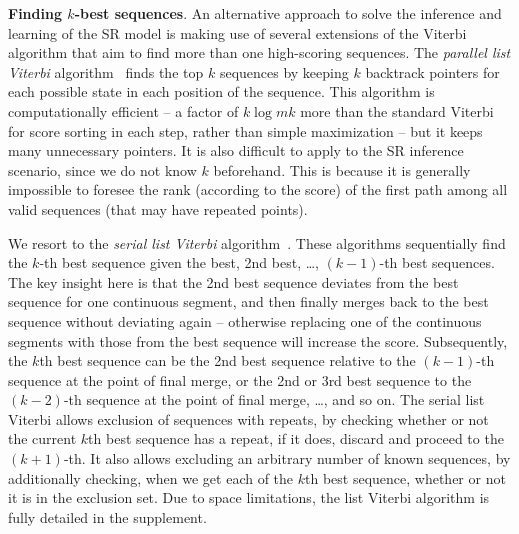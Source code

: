 \textbf{Finding $k$-best sequences}.
An alternative approach to solve the inference and learning of the SR model is making use of 
several extensions of the Viterbi algorithm that aim to find more than one high-scoring sequences.
The \emph{parallel list Viterbi} algorithm~\cite{seshadri1994list} finds the top $k$ sequences
by keeping $k$ backtrack pointers for each possible state in each position of the sequence.
This algorithm is computationally efficient
-- a factor of $k\log mk$ %
more than the standard Viterbi for score sorting in each step, rather than simple maximization
-- but it keeps many unnecessary pointers. It is also difficult to apply to the SR inference scenario,
since we do not know $k$ beforehand. This is because it is generally impossible to foresee
the rank (according to the score) of the first path among all valid sequences (that may have repeated points).

We resort to the \emph{serial list Viterbi} algorithm~\cite{seshadri1994list,nilsson2001sequentially}.
These algorithms sequentially find the $k$-th best sequence given the best, 2nd best, \dots, $(k \!-\! 1)$-th best sequences.
The key insight here is that the 2nd best sequence deviates from the best sequence
for one continuous segment, and then finally merges back to the best sequence without deviating again
-- otherwise replacing one of the continuous segments with those from the best sequence will increase the score.
Subsequently, the $k$th best sequence can be the 2nd best sequence relative to the $(k \!-\! 1)$-th sequence
at the point of final merge, or the 2nd or 3rd best sequence to the $(k \!-\! 2)$-th sequence at the point of final merge, \ldots, and so on.
The serial list Viterbi allows exclusion of sequences with repeats, by checking whether or not the current $k$th best sequence has a repeat, if it does, discard and proceed to the $(k \!+\! 1)$-th. It also allows excluding an arbitrary number of known sequences, by additionally checking, when we get each of the $k$th best sequence, whether or not it is in the exclusion set.
Due to space limitations, the list Viterbi algorithm is fully detailed in the supplement.

